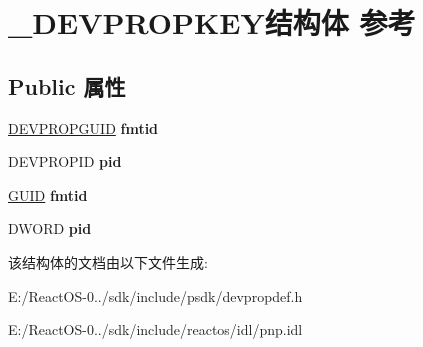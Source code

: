 \hypertarget{struct___d_e_v_p_r_o_p_k_e_y}{}\section{\+\_\+\+D\+E\+V\+P\+R\+O\+P\+K\+E\+Y结构体 参考}
\label{struct___d_e_v_p_r_o_p_k_e_y}
\subsection*{Public 属性}
\begin{DoxyCompactItemize}
\item 
\mbox{\label{struct___d_e_v_p_r_o_p_k_e_y_a85db7835b49db5fa8000e73f24f2caca}} 
\hyperlink{interface_g_u_i_d}{D\+E\+V\+P\+R\+O\+P\+G\+U\+ID} {\bfseries fmtid}
\item 
\mbox{\label{struct___d_e_v_p_r_o_p_k_e_y_a0abbb8a7a6be1ac98c4a0a02710a275c}} 
D\+E\+V\+P\+R\+O\+P\+ID {\bfseries pid}
\item 
\mbox{\label{struct___d_e_v_p_r_o_p_k_e_y_a8271bc788b56e47c19ffb1e5b4f4a115}} 
\hyperlink{interface_g_u_i_d}{G\+U\+ID} {\bfseries fmtid}
\item 
\mbox{\label{struct___d_e_v_p_r_o_p_k_e_y_a240b145ec0abb23419e44b29311015a2}} 
D\+W\+O\+RD {\bfseries pid}
\end{DoxyCompactItemize}


该结构体的文档由以下文件生成\+:\begin{DoxyCompactItemize}
\item 
E\+:/\+React\+O\+S-\/0../sdk/include/psdk/devpropdef.\+h\item 
E\+:/\+React\+O\+S-\/0../sdk/include/reactos/idl/pnp.\+idl\end{DoxyCompactItemize}
